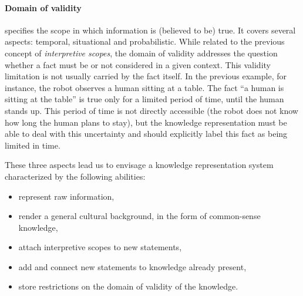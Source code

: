 \documentclass{svmult}
\begin{document}
\paragraph{Domain of validity} specifies the scope in which
 information is (believed to be) true. It covers several aspects: temporal,
situational and probabilistic. While related to the previous concept of
\emph{interpretive scopes}, the domain of validity addresses the question
whether a fact must be or not considered in a given context. This validity
limitation is not usually carried by the fact itself. In the previous example,
for instance, the robot observes a human sitting at a table.  The fact ``a
human is sitting at the table'' is true only for a limited period of time,
until the human stands up. This period of time is not directly accessible
(the robot does not know how long the human plans to stay), but the
knowledge representation must be able to deal with this uncertainty and
should explicitly label this fact as being limited in time.

These three aspects lead us to envisage a knowledge representation system
characterized by the following abilities: 
\begin{itemize}
	\item represent raw information,
	\item render a general cultural background, in the form of common-sense knowledge,
	\item attach interpretive scopes to new statements,
	\item add and connect new statements to knowledge already present,
	\item store restrictions on the domain of validity of the knowledge.
\end{itemize}
\end{document}
